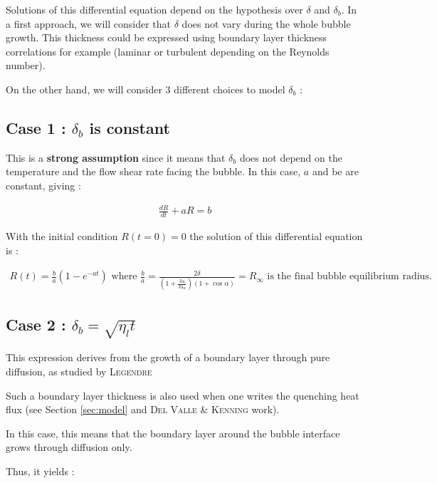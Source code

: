 \npar

Solutions of this differential equation depend on the hypothesis over $\delta$ and $\delta_{b}$. In a first approach, we will consider that $\delta$ does not vary during the whole bubble growth. This thickness could be expressed using boundary layer thickness correlations for example (laminar or turbulent depending on the Reynolds number). 

\npar

On the other hand, we will consider 3 different choices to model $\delta_{b}$ :


\npar
\subsection{Case 1 : $\delta_{b}$ is constant}


This is a \textbf{strong assumption} since it means that $\delta_{b}$ does not depend on the temperature and the flow shear rate facing the bubble. In this case, $a$ and be are constant, giving : 


\begin{align}
\frac{dR}{dt} + aR = b
\end{align}


With the initial condition $R(t=0)=0$ the solution of this differential equation is : 

\begin{align}
R\left(t\right)=\frac{b}{a}\left(1 - e^{-at}\right) \text{ where } \frac{b}{a} = \frac{2\delta}{\left(1 + \frac{\text{Ja}_{l}}{\text{Ja}_{w}}\right)\left(1 + \cos{\alpha} \right )}=R_{\infty} \text{ is the final bubble equilibrium radius.}
\end{align}


\subsection{Case 2 : $\delta_{b}=\sqrt{\eta_{l}t}$}
\npar

This expression derives from the growth of a boundary layer through pure diffusion, as studied by \textsc{Legendre} \etal

Such a boundary layer thickness is also used when one writes the quenching heat flux (see Section \ref{sec:model} and \textsc{Del Valle \& Kenning} work).

In this case, this means that the boundary layer around the bubble interface grows through diffusion only.

\npar

Thus, it yields :

